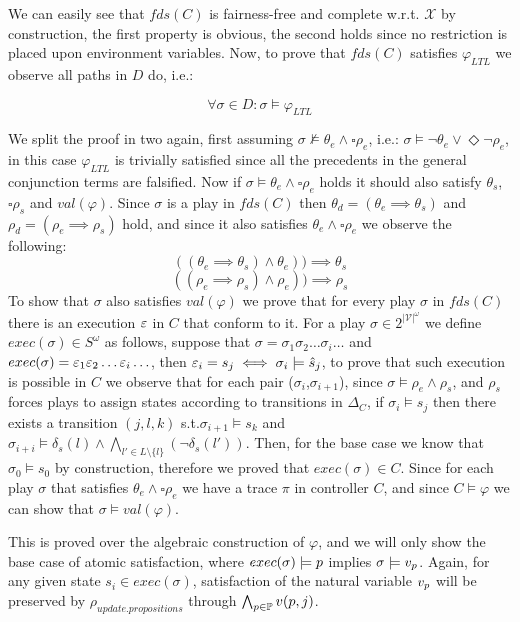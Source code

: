 We can easily see that $fds(C)$ is fairness-free and complete w.r.t. $\mathcal{X}$ by construction, the first property is obvious, the second holds since no restriction is placed upon environment variables. Now, to prove that $fds(C)$ satisfies $\varphi_{LTL}$ we observe all paths in $D$ do, i.e.:

\[\forall \sigma \in D: \sigma \models \varphi_{LTL} \]

We split the proof in two again, first assuming $\sigma \not\models \theta_e \wedge \square \rho_e$, i.e.: $\sigma \models \neg\theta_e \vee \Diamond \neg\rho_e$, in this case $\varphi_{LTL}$ is trivially satisfied since all the precedents in the general conjunction terms are falsified. Now if $\sigma \models \theta_e \wedge \square \rho_e$ holds it should also satisfy $\theta_s$, $\square\rho_s$ and $val(\varphi)$. Since $\sigma$ is a play in $fds(C)$ then $\theta_d=(\theta_e \implies \theta_s)$ and $\rho_d=(\rho_e \implies \rho_s)$ hold, and since it also satisfies $\theta_e \wedge \square \rho_e$ we observe the following:
\[((\theta_e \implies \theta_s) \wedge \theta_e))\implies \theta_s\]
\[((\rho_e \implies \rho_s) \wedge \rho_e))\implies \rho_s\]
To show that $\sigma$ also satisfies $val(\varphi)$ we prove that for every play $\sigma$ in $fds(C)$ there is an execution ${\varepsilon}$ in $C$ that conform to it.
For a play $\sigma \in 2^{|\mathcal{V}|^{\omega}}$ we define $exec(\sigma) \in S^{\omega}$ as follows, suppose that $\sigma = \sigma_1 \sigma_2 \ldots \sigma_i \ldots$ and
$exec(\sigma)= {\varepsilon}_1 {\varepsilon}_2 \ldots {\varepsilon}_i \ldots$, then ${\varepsilon}_i = s_j \iff \sigma_i \models \hat{s}_{j}$, to prove that such execution is possible in $C$ we observe that for each pair ($\sigma_i$,$\sigma_{i+1}$), since $\sigma \models \rho_e \wedge \rho_s$, and $\rho_s$ forces
plays to assign states according to transitions in $\Delta_C$, if $\sigma_i \models s_j$ then there exists a transition $(j, l, k)$ s.t.$\sigma_{i+1} \models s_k$ and $\sigma_{i+i} \models \delta_s(l) \wedge \bigwedge_{l' \in L \setminus \{l\}}(\neg \delta_s(l'))$. Then, for the base case we know that $\sigma_0 \models s_0$ by construction, therefore we proved that $exec(\sigma) \in C$.
Since for each play $\sigma$ that satisfies $\theta_e \wedge \square \rho_e$ we have a trace $\pi$ in controller $C$, and since $C \models \varphi$ we can show that $\sigma \models val(\varphi)$.


This is proved over the algebraic construction of $\varphi$, and we will only show the base case of atomic satisfaction, where
$exec(\sigma) \models {p}$ implies $\sigma \models v_{{p}}$. Again, for any given state $s_i \in exec(\sigma)$, satisfaction of the natural variable $v_{{p}}$ will be preserved by  $\rho_{update.propositions}$ through $\bigwedge_{{p} \in {\mathbb{P}}}v({p},j)$.


